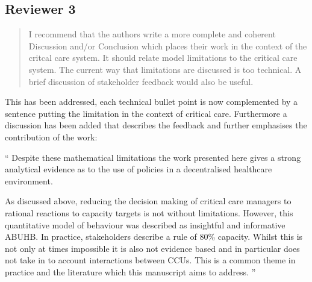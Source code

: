 \documentclass{article}
\begin{document}
\subsection{Reviewer 3}


\begin{quote}
    \begin{textit}
        {I recommend that the authors write a more complete and coherent
        Discussion and/or Conclusion which places their work in the context of
        the critcal care system.  It should relate model limitations to the
        critical care system. The current way that limitations are discussed
        is too technical. A brief discussion of stakeholder feedback would
        also be useful.}
    \end{textit}
\end{quote}

This has been addressed, each technical bullet point is now complemented by a
sentence putting the limitation in the context of critical care. Furthermore a
discussion has been added that describes the feedback and further emphasises the
contribution of the work:

``
Despite these mathematical limitations the work presented here gives a strong
analytical evidence as to the use of policies in a decentralised healthcare
environment.

As discussed above, reducing the decision making of critical care managers to
rational reactions to capacity targets is not without limitations. However, this
quantitative model of behaviour was described as insightful and informative
ABUHB. In practice, stakeholders describe a rule of 80\% capacity. Whilst this
is not only at times impossible it is also not evidence based and in particular
does not take in to account interactions between CCUs. This is a common theme in
practice and the literature which this manuscript aims to address.
''
\end{document}
